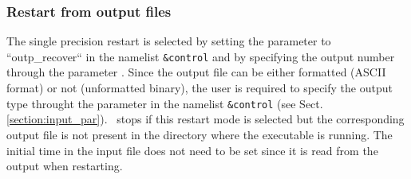 \subsubsection{Restart from output files}
The single precision restart is selected by setting the 
 parameter to ``outp\_recover`` 
in the namelist {\tt \&control}
and by specifying the output number through the parameter .
Since the output file can be either formatted (ASCII format) or not
(unformatted binary), the user is required to specify the output
type throught the parameter  in the  namelist 
{\tt \&control} (see Sect. \ref{section:input_par}).
\PDAC\ stops if this 
restart mode is selected but the corresponding output file is not present 
in the directory where the executable is running.
The initial time in the input file does not need to be set
since it is read from the output when restarting.


